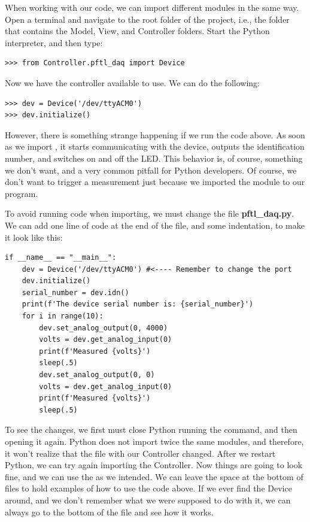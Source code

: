 When working with our code, we can import different modules in the same way. Open a terminal and navigate to the root folder of the project, i.e., the folder that contains the Model, View, and Controller folders. Start the Python interpreter, and then type:

\begin{verbatim}
>>> from Controller.pftl_daq import Device
\end{verbatim}

Now we have the controller available to use. We can do the following:

\begin{verbatim}
>>> dev = Device('/dev/ttyACM0')
>>> dev.initialize()
\end{verbatim}

However, there is something strange happening if we run the code above. As soon as we import , it starts communicating with the device, outputs the identification number, and switches on and off the LED. This behavior is, of course, something we don't want, and a very common pitfall for Python developers. Of course, we don't want to trigger a measurement just because we imported the module to our program.

To avoid running code when importing, we must change the file \textbf{pftl\_daq.py}. We can add one line of code at the end of the file, and some indentation, to make it look like this:

\begin{verbatim}
if __name__ == "__main__":
    dev = Device('/dev/ttyACM0') #<---- Remember to change the port
    dev.initialize()
    serial_number = dev.idn()
    print(f'The device serial number is: {serial_number}')
    for i in range(10):
        dev.set_analog_output(0, 4000)
        volts = dev.get_analog_input(0)
        print(f'Measured {volts}')
        sleep(.5)
        dev.set_analog_output(0, 0)
        volts = dev.get_analog_input(0)
        print(f'Measured {volts}')
        sleep(.5)
\end{verbatim}

To see the changes, we first must close Python running the  command, and then opening it again. Python does not import twice the same modules, and therefore, it won't realize that the file with our Controller changed. After we restart Python, we can try again importing the Controller. Now things are going to look fine, and we can use the  as we intended. We can leave the space at the bottom of files to hold examples of how to use the code above. If we ever find the Device around, and we don't remember what we were supposed to do with it, we can always go to the bottom of the file and see how it works.

